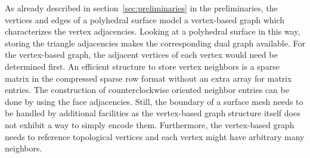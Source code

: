 \documentclass{stdlocal}
\begin{document}
  As already described in section~\ref{sec:preliminaries} in the preliminaries, the vertices and edges of a polyhedral surface model a vertex-based graph which characterizes the vertex adjacencies.
  Looking at a polyhedral surface in this way, storing the triangle adjacencies makes the corresponding dual graph available.
  For the vertex-based graph, the adjacent vertices of each vertex would need be determined first.
  An efficient structure to store vertex neighbors is a sparse matrix in the compressed sparse row format without an extra array for matrix entries.
  The construction of counterclockwise oriented neighbor entries can be done by using the face adjacencies.
  Still, the boundary of a surface mesh needs to be handled by additional facilities as the vertex-based graph structure itself does not exhibit a way to simply encode them.
  Furthermore, the vertex-based graph needs to reference topological vertices and each vertex might have arbitrary many neighbors.



\end{document}
